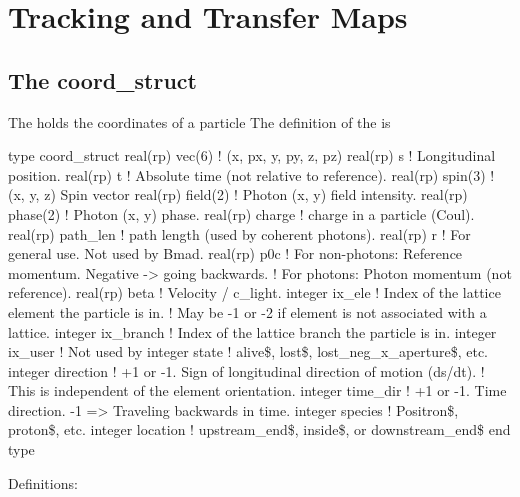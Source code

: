 \chapter{Tracking and Transfer Maps}
\label{c:tracking}

\section{The coord_struct}
\label{s:coord.struct}

The  holds the coordinates of a particle The definition of the  is
\begin{example}
  type coord_struct
    real(rp) vec(6)     ! (x, px, y, py, z, pz)
    real(rp) s          ! Longitudinal position.
    real(rp) t          ! Absolute time (not relative to reference).
    real(rp) spin(3)    ! (x, y, z) Spin vector
    real(rp) field(2)   ! Photon (x, y) field intensity.
    real(rp) phase(2)   ! Photon (x, y) phase.
    real(rp) charge     ! charge in a particle (Coul).
    real(rp) path_len   ! path length (used by coherent photons).
    real(rp) r          ! For general use. Not used by Bmad.
    real(rp) p0c        ! For non-photons: Reference momentum. Negative -> going backwards.
                        !     For photons: Photon momentum (not reference).
    real(rp) beta       ! Velocity / c_light. 
    integer ix_ele      ! Index of the lattice element the particle is in.
                        !   May be -1 or -2 if element is not associated with a lattice.
    integer ix_branch   ! Index of the lattice branch the particle is in.
    integer ix_user     ! Not used by \bmad
    integer state       ! alive\$, lost\$, lost_neg_x_aperture\$, etc.
    integer direction   ! +1 or -1. Sign of longitudinal direction of motion (ds/dt).
                        !  This is independent of the element orientation.
    integer time_dir    ! +1 or -1. Time direction. -1 => Traveling backwards in time.
    integer species     ! Positron\$, proton\$, etc.
    integer location    ! upstream_end\$, inside\$, or downstream_end\$
end type
\end{example}
Definitions:
